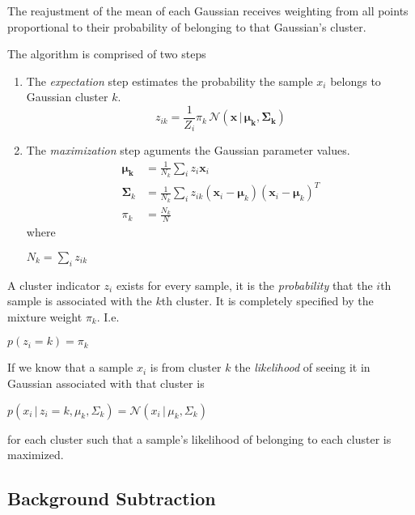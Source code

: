 The reajustment of the mean of each Gaussian receives weighting from all points proportional to their probability of belonging to that Gaussian's cluster.

The algorithm is comprised of two steps


\begin{enumerate}
	\item The \emph{expectation} step estimates the probability the sample $x_i$ belongs to Gaussian cluster $k$.
	\begin{equation}
		z_{ik} = \frac{1}{Z_i}\pi_k\, \mathcal{N}(\bm{x}\,|\,\bm{\mu_k},\bm{\Sigma_k})
	\end{equation}

	\item The \emph{maximization} step aguments the Gaussian parameter values.
	\begin{align*}	
	\tag{eqn1}
	\bm{\mu_k} &= \frac{1}{N_k}\sum_i z_i \bm{x}_i \\
	\tag{eqn2}
	\bm{\Sigma}_k &=  \frac{1}{N_k}\sum_i z_{ik} (\bm{x}_i - \bm{\mu}_k)(\bm{x}_i - \bm{\mu}_k)^T \\
	\tag{eqn3}
	\pi_k &= \frac{N_k}{N}
	\end{align*}
	where \newline
	\centerline{$N_k = \sum_i z_{ik}$}
\end{enumerate}












A cluster indicator $z_i$ exists for every sample, it is the \emph{probability} that the $i$th sample is associated with the $k$th cluster. It is completely specified by the mixture weight $\pi_k$. I.e.

$p(z_i=k) = \pi_k $

If we know that a sample $x_i$ is from cluster $k$ the \emph{likelihood} of seeing it in Gaussian associated with that cluster is

$ p(x_i\, |\, z_i = k, \mu_k, \Sigma_k) = \mathcal{N}(x_i\, |\,\mu_k, \Sigma_k)$ 







for each cluster such that a sample's likelihood of belonging to each cluster is maximized. 






\subsection{Background Subtraction}

